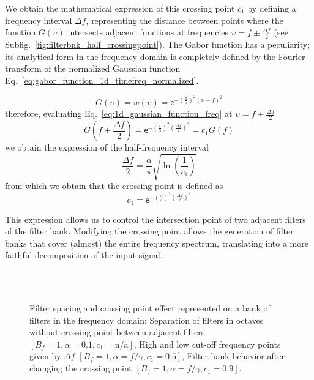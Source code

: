 We obtain the mathematical expression of this crossing point $c_1$ by defining a frequency interval $\Delta f$, representing the distance between points where the function $G(\upsilon)$ intersects adjacent functions at frequencies $\upsilon = f \pm \frac{\Delta f}{2}$ (see Subfig.\ \ref{fig:filterbnk_half_crossingpoint}). The Gabor function has a peculiarity;  its analytical form in the frequency domain is completely defined by the Fourier transform of the normalized Gaussian function Eq.\ \eqref{eq:gabor_function_1d_timefreq_normalized}.

\begin{equation}\label{eq:1d_gaussian_function_freq}
    G(\upsilon) = w(\upsilon) = \mathsf{e}^{-\left(\frac{\pi}{\alpha}\right) ^{2} (\upsilon-f)^2}
\end{equation}
therefore, evaluating Eq.\ \eqref{eq:1d_gaussian_function_freq} at $\upsilon = f + \frac{\Delta f}{2}$
\begin{equation}\label{eq:constant_crossing_point}
    G\left(f + \frac{\Delta f}{2}\right) = \mathsf{e}^{-\left(\frac{\pi}{\alpha}\right)^2 \left(\frac{\Delta f}{2}\right)^2} = c_1 G(f) 
\end{equation}
we obtain the expression of the half-frequency interval 
\begin{equation}\label{eq:frequency_interval_crossing_point}
    \frac{\Delta f}{2} = \frac{\alpha}{\pi}\sqrt{\ln \left(\frac{1}{c_1}\right)}
\end{equation}
from which we obtain that the crossing point is defined as
\begin{equation}\label{eq:crossing_point}
    c_1 = \mathsf{e}^{-\left(\frac{\alpha}{\pi} \right)^2 \left(\frac{\Delta f}{2}\right)^2 }
\end{equation}

This expression allows us to control the intersection point of two adjacent filters of the filter bank. Modifying the crossing point allows the generation of filter banks that cover (almost) the entire frequency spectrum, translating into a more faithful decomposition of the input signal.

\begin{figure}[!ht]
\centering
     \\
    \\
\caption{Filter spacing and crossing point effect represented on a bank of filters in the frequency domain:  Separation of filters in octaves without crossing point between adjacent filters $[B_f=1, \alpha=0.1, c_1=\text{n/a}]$,  High and low cut-off frequency points given by $\Delta f$ $[B_f=1, \alpha=f/\gamma, c_1=0.5]$,  Filter bank behavior after changing the crossing point $[B_f=1, \alpha=f/\gamma, c_1=0.9]$.}\label{fig:1d_filterbank_spacing}
\end{figure}


